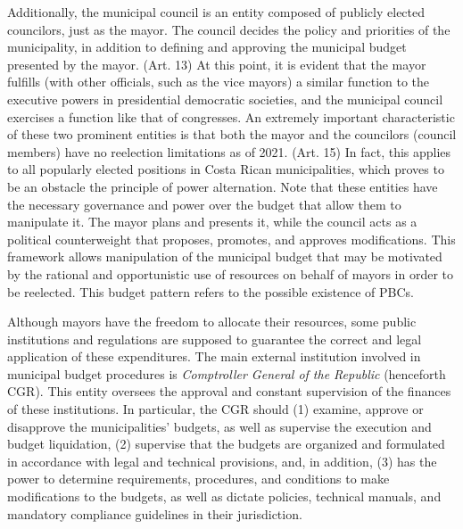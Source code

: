 Additionally, the municipal council is an entity composed of publicly elected councilors, just as the mayor. The council decides the policy and priorities of the municipality, in addition to defining and approving the municipal budget presented by the mayor. (Art. 13) At this point, it is evident that the mayor fulfills (with other officials, such as the vice mayors) a similar function to the executive powers in presidential democratic societies, and the municipal council exercises a function like that of congresses. An extremely important characteristic of these two prominent entities is that both the mayor and the councilors (council members) have no reelection limitations as of 2021. (Art. 15) In fact, this applies to all popularly elected positions in Costa Rican municipalities, which proves to be an obstacle the principle of power alternation. 
Note that these entities have the necessary governance and power over the budget that allow them to manipulate it. The mayor plans and presents it, while the council acts as a political counterweight that proposes, promotes, and approves modifications. This framework allows manipulation of the municipal budget that may be motivated by the rational and opportunistic use of resources on behalf of mayors in order to be reelected. This budget pattern refers to the possible existence of PBCs.

Although mayors have the freedom to allocate their resources, some public institutions and regulations are supposed to guarantee the correct and legal application of these expenditures. The main external institution involved in municipal budget procedures is \textit{Comptroller General of the Republic} (henceforth CGR). This entity oversees the approval and constant supervision of the finances of these institutions. In particular, the CGR should (1) examine, approve or disapprove the municipalities' budgets, as well as supervise the execution and budget liquidation, (2) supervise that the budgets are organized and formulated in accordance with legal and technical provisions, and, in addition, (3) has the power to determine requirements, procedures, and conditions to make modifications to the budgets, as well as dictate policies, technical manuals, and mandatory compliance guidelines in their jurisdiction. \parencite[p.2]{asamblea2008}


